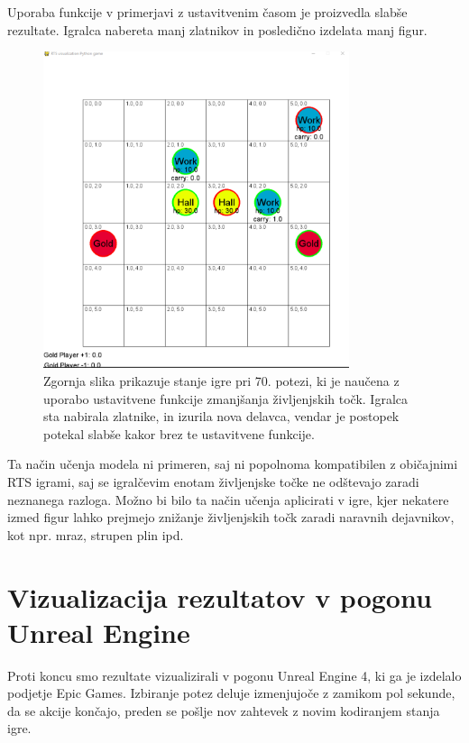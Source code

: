 \documentclass[a4paper, 12pt]{book}
\begin{document}
Uporaba funkcije v primerjavi z ustavitvenim časom je proizvedla slabše rezultate.
Igralca nabereta manj zlatnikov in posledično izdelata manj figur.

\begin{figure}[h]
	\begin{center}
		\includegraphics[width=0.8\textwidth]{photos/killFunction.pdf}
	\end{center}
	\caption{Zgornja slika prikazuje stanje igre pri 70. potezi, ki je naučena z uporabo ustavitvene funkcije zmanjšanja življenjskih točk. 
		Igralca sta nabirala zlatnike, in izurila nova delavca, vendar je postopek potekal slabše kakor brez te ustavitvene funkcije. }
	\label{vizualizacijaRezultatovKillFunction}
\end{figure}

Ta način učenja modela ni primeren, saj ni popolnoma kompatibilen z običajnimi RTS igrami, saj se igralčevim enotam življenjske točke ne odštevajo zaradi neznanega razloga.
Možno bi bilo ta način učenja aplicirati v igre, kjer nekatere izmed figur lahko prejmejo znižanje življenjskih točk zaradi naravnih dejavnikov, kot npr. mraz, strupen plin ipd.

\section{Vizualizacija rezultatov v pogonu Unreal Engine}
Proti koncu smo rezultate vizualizirali v pogonu Unreal Engine 4, ki ga je izdelalo podjetje Epic Games.
Izbiranje potez deluje izmenjujoče z zamikom pol sekunde, da se akcije končajo, preden se pošlje nov zahtevek z novim kodiranjem stanja igre.
\end{document}
